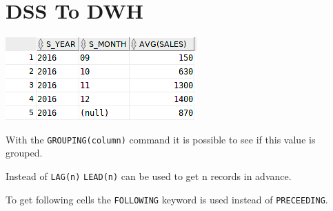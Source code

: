 
\section{DSS To DWH}

\begin{breakbox}
\begin{center}
	\includegraphics[width=.1\textwidth]{slides_images/grouping_sets_result}
\end{center}
With the \lstinline{GROUPING(column)} command it is possible
to see if this value is grouped.
\end{breakbox}

\begin{breakbox}
\end{breakbox}

\begin{breakbox}
Instead of  \lstinline{LAG(n)} \lstinline{LEAD(n)} can be used to get n records
in advance.
\end{breakbox}

\begin{breakbox}
\end{breakbox}

\begin{breakbox}
To get following cells the \lstinline{FOLLOWING} keyword is used instead of
\lstinline{PRECEEDING}.
\end{breakbox}


